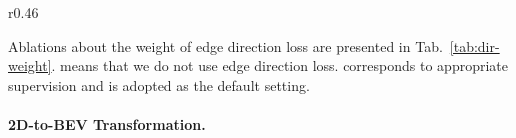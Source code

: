 \documentclass{article} \usepackage{iclr2023_conference,times}
\begin{document}
\begin{wraptable}{r}{0.46\linewidth}
\vspace{-1.0em}
\centering
{}
\vspace*{-0.25cm}
\caption{Ablations about the weight  of edge direction loss.}
\label{tab:dir-weight}
\vspace{-3em}
\end{wraptable}
Ablations about the weight of edge direction loss are presented in Tab.~\ref{tab:dir-weight}.  means that we do not use edge direction loss.  corresponds to appropriate supervision and is adopted as the default setting.
\vspace{1em}


\paragraph{2D-to-BEV Transformation.}
\end{document}
